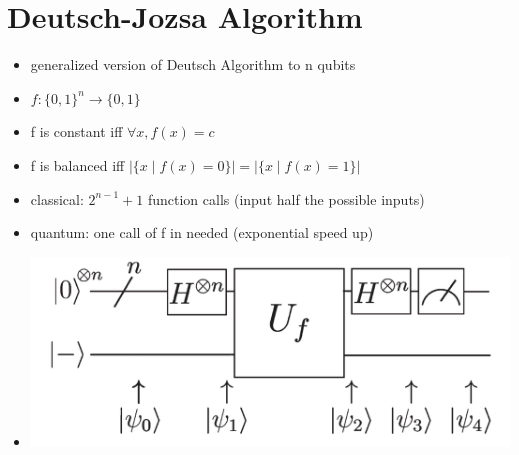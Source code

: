 \documentclass[12pt,a4paper]{article}
\newcommand{\ecb}[1]{\{#1\}}
\newcommand{\ket}[1]{\vert #1 \rangle}
\begin{document}
\section{Deutsch-Jozsa Algorithm}
\begin{itemize}
\item generalized version of Deutsch Algorithm to n qubits
\item $f : \ecb{0,1}^n \rightarrow \ecb{0,1}$
\item f is constant iff $\forall x, f(x) = c$
\item f is balanced iff $|\ecb{x \mid f(x) = 0}| = |\ecb{x \mid f(x) = 1}|$
\item classical: $2^{n-1}+1$ function calls (input half the possible inputs)
\item quantum: one call of f in needed (exponential speed up)
\item \includegraphics[scale=0.3]{./resources/jozsaplan.png}
\end{itemize}
\end{document}
